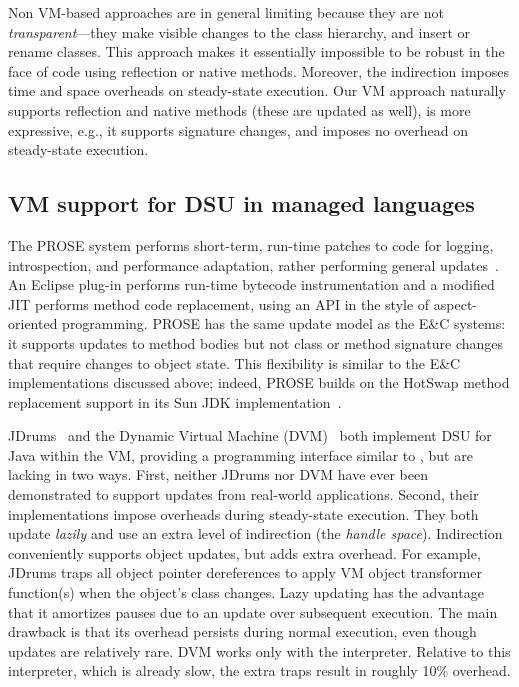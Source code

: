 Non VM-based approaches are in general limiting because they are not
\emph{transparent}---they make visible changes to the class hierarchy, and
insert or rename classes. This approach makes it essentially impossible to
be robust in the face of code using reflection or native methods.
Moreover, the indirection imposes time and space overheads on steady-state
execution.  Our VM approach naturally supports reflection and native
methods (these are updated as well), is more expressive, e.g., it
supports signature changes, and imposes no overhead on steady-state
execution.

\subsection{VM support for DSU in managed languages} 

The PROSE system performs short-term, run-time patches to code for logging,
introspection, and performance adaptation, rather performing general
updates~\cite{nicoara:eurosys08}.  An Eclipse plug-in performs run-time
bytecode instrumentation and a modified JIT performs method code
replacement, using an API in the style of aspect-oriented programming.
PROSE has the same update model as the E\&C systems: it supports updates to
method bodies but not class or method signature changes that require
changes to object state.  This flexibility is similar to the E\&C
implementations discussed above; indeed, PROSE builds on the HotSwap method
replacement support in its Sun JDK implementation~\cite{JVMhotswap}.

JDrums~\cite{ritzau00dynamic} and the Dynamic Virtual Machine
(DVM)~\cite{Mala00a} both implement DSU for Java within the VM, providing a
programming interface similar to \JV, but are lacking in two ways.  First,
neither JDrums nor DVM have ever been demonstrated to support updates from
real-world applications.  Second, their implementations impose overheads
during steady-state execution.  They both update \emph{lazily} and use an
extra level of indirection (the \emph{handle space}).  Indirection
conveniently supports object updates, but adds extra overhead.  For
example, JDrums traps all object pointer dereferences to apply VM object
transformer function(s) when the object's class changes.  Lazy updating has
the advantage that it amortizes  pauses due to an update over subsequent
execution.  The main drawback is that its overhead persists during normal
execution, even though updates are relatively rare.  DVM works only with
the interpreter.  Relative to this interpreter, which is already slow, the
extra traps result in roughly 10\% overhead.

